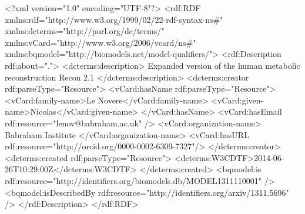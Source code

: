 \begin{example}
<?xml version="1.0" encoding="UTF-8"?>
<rdf:RDF xmlns:rdf="http://www.w3.org/1999/02/22-rdf-syntax-ns#"
         xmlns:dcterms="http://purl.org/dc/terms/"
         xmlns:vCard="http://www.w3.org/2006/vcard/ns#"
         xmlns:bqmodel="http://biomodels.net/model-qualifiers/">
    <rdf:Description rdf:about=".">
        <dcterms:description>
            Expanded version of the human metabolic reconstruction Recon 2.1
        </dcterms:description>
        <dcterms:creator rdf:parseType="Resource">
            <vCard:hasName rdf:parseType="Resource">
                <vCard:family-name>Le Novere</vCard:family-name>
                <vCard:given-name>Nicolas</vCard:given-name>
            </vCard:hasName>
            <vCard:hasEmail rdf:resource="lenov@babraham.ac.uk" />
            <vCard:organization-name>
                Babraham Institute
            </vCard:organization-name>
            <vCard:hasURL rdf:resource="http://orcid.org/0000-0002-6309-7327"/>
        </dcterms:creator>
        <dcterms:created rdf:parseType="Resource">
            <dcterms:W3CDTF>2014-06-26T10:29:00Z</dcterms:W3CDTF>
        </dcterms:created>
        <bqmodel:is      
             rdf:resource="http://identifiers.org/biomodels.db/MODEL1311110001" />
        <bqmodel:isDescribedBy       
             rdf:resource="http://identifiers.org/arxiv/1311.5696" />
    </rdf:Description>
</rdf:RDF>
\end{example}
